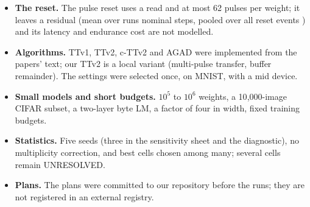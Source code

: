 \begin{itemize}
\item \textbf{The reset.} The pulse reset uses a read and at most 62 pulses per weight; it leaves a residual (mean over runs
      \RVResetResidMean{} nominal steps, pooled over all reset events \RVResetResidPooled) and its latency and endurance cost are not modelled.
\item \textbf{Algorithms.} TTv1, TTv2, c-TTv2 and AGAD were implemented from the papers' text; our TTv2 is a local variant
      (multi-pulse transfer, buffer remainder). The settings were selected once, on MNIST, with a mid device.
\item \textbf{Small models and short budgets.} $10^5$ to $10^6$ weights, a 10{,}000-image CIFAR subset, a two-layer byte LM,
      a factor of four in width, fixed training budgets.
\item \textbf{Statistics.} Five seeds (three in the sensitivity sheet and the diagnostic), no multiplicity correction, and best
      cells chosen among many; several cells remain UNRESOLVED.
\item \textbf{Plans.} The plans were committed to our repository before the runs; they are not registered in an external
      registry.
\end{itemize}
